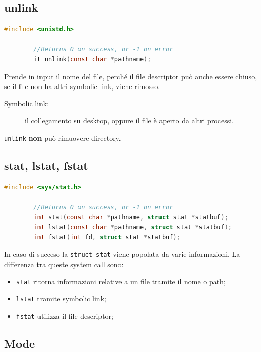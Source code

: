 \documentclass[a4paper, 12pt]{book}
\begin{document}
    \subsection{unlink}

    \begin{lstlisting}[language=C]
        #include <unistd.h>

        //Returns 0 on success, or -1 on error
        it unlink(const char *pathname);
    \end{lstlisting}
    Prende in input il nome del file, perché il file descriptor
    può anche essere chiuso, se il file non ha altri symbolic 
    link, viene rimosso.
    \begin{description}
        \item[Symbolic link:] il collegamento su desktop, oppure il file è aperto da altri processi. 
    \end{description}
    \verb|unlink| \textbf{non} può rimuovere directory.

    \subsection{stat, lstat, fstat}

    \begin{lstlisting}[language=C]
        #include <sys/stat.h>

        //Returns 0 on success, or -1 on error
        int stat(const char *pathname, struct stat *statbuf);
        int lstat(const char *pathname, struct stat *statbuf);
        int fstat(int fd, struct stat *statbuf);
    \end{lstlisting}
    In caso di succeso la \verb|struct stat| viene popolata da 
    varie informazioni. La differenza tra queste system call 
    sono: 
    \begin{itemize}
        \item \verb|stat| ritorna informazioni relative a un file tramite il nome o path;
        \item \verb|lstat| tramite symbolic link;
        \item \verb|fstat| utilizza il file descriptor;
    \end{itemize}
    
    \subsection{Mode}
\end{document}

